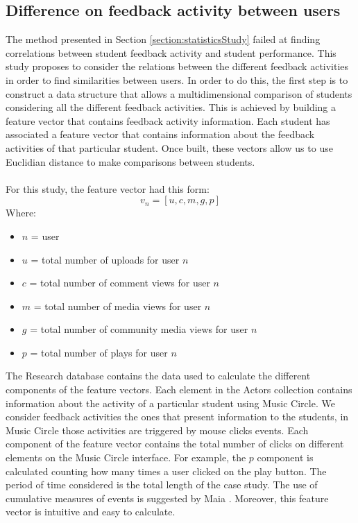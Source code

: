 \documentclass[11pt, oneside]{article}   	%
\begin{document}
\subsection{Difference on feedback activity between users}
The method presented in Section \ref{section:statisticsStudy} failed at finding correlations between student feedback activity and student performance. This study proposes to consider the relations between the different feedback activities in order to find similarities between users. In order to do this, the first step is to construct a data structure that allows a multidimensional comparison of students considering all the different feedback activities. This is achieved by building a feature vector that contains feedback activity information. Each student has associated a feature vector that contains information about the feedback activities of that particular student. Once built, these vectors allow us to use Euclidian distance to make comparisons between students.\\\\
For this study, the feature vector had this form:
\begin{equation}
v_n=[u,c,m,g,p]
\label{featureVector1}
\end{equation}
Where:
\begin{itemize}
	\item $n$ = user
	\item $u$ = total number of uploads for user $n$
	\item $c$ = total number of comment views for user $n$
	\item $m$ = total number of media views for user $n$
	\item $g$ = total number of community media views for user $n$
	\item $p$ = total number of plays for user $n$
\end{itemize}
The Research database contains the data used to calculate the different components of the feature vectors. Each element in the Actors collection contains information about the activity of a particular student using Music Circle. We consider feedback activities the ones that present information to the students, in Music Circle those activities are triggered by mouse clicks events. Each component of the feature vector contains the total number of clicks on different elements on the Music Circle interface. For example, the $p$ component is calculated counting how many times a user clicked on the play button. The period of time considered is the total length of the case study. The use of cumulative measures of events is suggested by Maia \cite{Maia2008}. Moreover, this feature vector is intuitive and easy to calculate.\\\\
\end{document}
